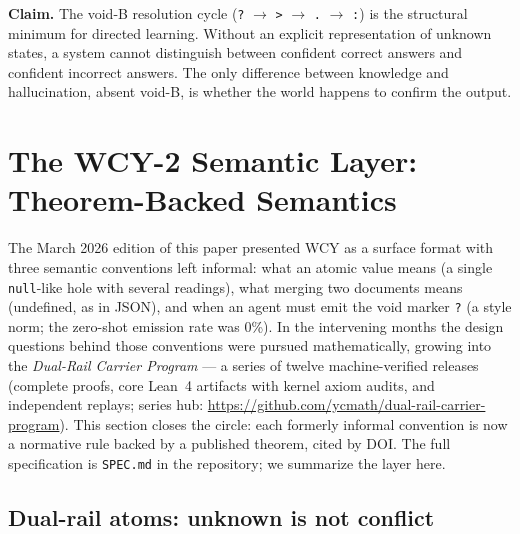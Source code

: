 \documentclass[11pt,a4paper]{article}
\begin{document}
\begin{claimbox}
\textbf{Claim.} The void-B resolution cycle (\texttt{?} $\to$ \texttt{>} $\to$ \texttt{.} $\to$ \texttt{:}) is the structural minimum for directed learning. Without an explicit representation of unknown states, a system cannot distinguish between confident correct answers and confident incorrect answers. The only difference between knowledge and hallucination, absent void-B, is whether the world happens to confirm the output.
\end{claimbox}


\section{The WCY-2 Semantic Layer: Theorem-Backed Semantics}
\label{sec:wcy2}

The March 2026 edition of this paper presented WCY as a surface format
with three semantic conventions left informal: what an atomic value
means (a single \texttt{null}-like hole with several readings), what
merging two documents means (undefined, as in JSON), and when an agent
must emit the void marker \texttt{?} (a style norm; the zero-shot
emission rate was 0\%). In the intervening months the design questions
behind those conventions were pursued mathematically, growing into the
\emph{Dual-Rail Carrier Program} --- a series of twelve machine-verified
releases (complete proofs, core Lean~4 artifacts with kernel axiom
audits, and independent replays; series hub:
\url{https://github.com/ycmath/dual-rail-carrier-program}). This section
closes the circle: each formerly informal convention is now a normative
rule backed by a published theorem, cited by DOI. The full specification
is \texttt{SPEC.md} in the repository; we summarize the layer here.

\subsection{Dual-rail atoms: unknown is not conflict}
\end{document}
